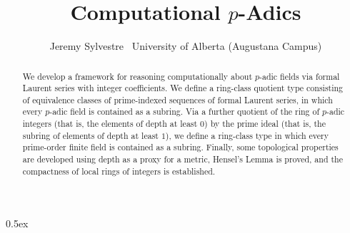 \documentclass[11pt,a4paper]{article}
\begin{document}
\title{Computational $p$-Adics}
\author{Jeremy Sylvestre \ University of Alberta (Augustana Campus)}
\maketitle

\begin{abstract}
  We develop a framework for reasoning computationally about $p$-adic fields via formal Laurent
  series with integer coefficients.
  We define a ring-class quotient type consisting of equivalence classes of prime-indexed
  sequences of formal Laurent series,
  in which every $p$-adic field is contained as a subring.
  Via a further quotient of the ring of $p$-adic integers
  (that is, the elements of depth at least $0$) by the prime ideal
  (that is, the subring of elements of depth at least $1$),
  we define a ring-class type in which every prime-order finite field is contained as a subring.
  Finally, some topological properties are developed using depth as a proxy for a metric,
  Hensel's Lemma is proved,
  and the compactness of local rings of integers is established.
\end{abstract}

\tableofcontents

\parindent 0pt\parskip 0.5ex



\nocite{*}


\end{document}
